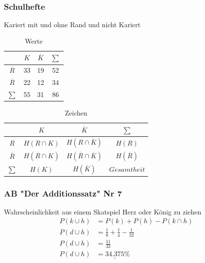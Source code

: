 \documentclass[a4paper,12pt]{article}
\begin{document}
\subsubsection*{Schulhefte}
Kariert mit und ohne Rand und nicht Kariert\\
\begin{table}[h!]
  \begin{center}
    \caption{Werte}
    \label{tab:table1}
    \begin{tabular}{c|c|c|c} %
      \textbf{} & \textbf{$K$} & \textbf{$\overline{K}$} & \textbf{$\sum$}\\
      \hline
      $R$ & 33 & 19 & 52\\
      \hline
      $\overline{R}$ & 22 & 12 & 34\\
      \hline
      $\sum$ & 55 & 31 & 86\\
    \end{tabular}
  \end{center}
\end{table}
\begin{table}[h!]
  \begin{center}
    \caption{Zeichen}
    \label{tab:table1}
    \begin{tabular}{c|c|c|c} %
      \textbf{} & \textbf{$K$} & \textbf{$\overline{K}$} & \textbf{$\sum$}\\
      \hline
      $R$ & $H(R \cap K)$ & $H(R \cap \overline{K})$ & $H(R)$\\
      \hline
      $\overline{R}$ & $H(\overline{R} \cap K)$ & $H(\overline{R} \cap \overline{K})$ & $H(\overline{R})$\\
      \hline
      $\sum$ & $H(K)$ & $H(\overline{K})$ & $Gesamtheit$\\
    \end{tabular}
  \end{center}
\end{table}
\subsubsection*{AB "Der Additionssatz" Nr 7}
Wahrscheinlichkeit aus einem Skatspiel Herz oder König zu ziehen\\
\begin{equation*}
\begin{split}
P(k \cup h) & = P(k) + P(h) - P(k \cap h)\\
P(d \cup h) & = \frac{1}{8} + \frac{1}{4} - \frac{1}{32}\\
P(d \cup h) & = \frac{11}{32}\\
P(d \cup h) & = \underline{\underline{34.375}} \%\\
\end{split}
\end{equation*}
\end{document}
